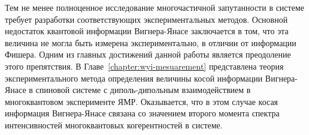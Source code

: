 Тем не менее полноценное исследование многочастичной запутанности в системе
требует разработки соответствующих экспериментальных методов.
Основной недостаток квантовой информации Вигнера-Янасе заключается в том,
что эта величина не могла быть измерена экспериментально,
в отличии от информации Фишера\cite{Garttner2018}.
Одним из главных достижений данной работы является преодоление этого препятствия.
В Главе~\ref{chapter:wyi-mesuarement} представлена теория экспериментального метода определения величины косой информации Вигнера-Янасе
в спиновой системе с диполь-дипольным взаимодействием в многоквантовом эксперименте ЯМР.
Оказывается,
что в этом случае косая информация Вигнера-Янасе связана со значением
второго момента спектра интенсивностей многоквантовых когерентностей в системе.

